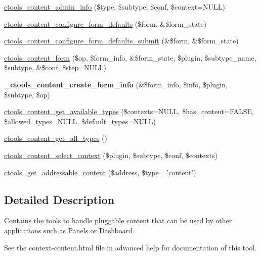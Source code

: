 \begin{DoxyCompactItemize}
\hyperlink{content_8inc_add05b7edd8612b6dfcea3eb5c7cea4cf}{ctools\_\-content\_\-admin\_\-info} (\$type, \$subtype, \$conf, \$context=NULL)
\item 
\hyperlink{content_8inc_aa433fb0534a5179c0f00b556dd22b5b3}{ctools\_\-content\_\-configure\_\-form\_\-defaults} (\$form, \&\$form\_\-state)
\item 
\hyperlink{content_8inc_af413cf9d35b010c5f527c1d2345c840c}{ctools\_\-content\_\-configure\_\-form\_\-defaults\_\-submit} (\&\$form, \&\$form\_\-state)
\item 
\hyperlink{content_8inc_a1eac5a29677be088ca112ac5158059a8}{ctools\_\-content\_\-form} (\$op, \$form\_\-info, \&\$form\_\-state, \$plugin, \$subtype\_\-name, \$subtype, \&\$conf, \$step=NULL)
\item 
\hypertarget{content_8inc_a6555b18d0f009f095fc84705804a3d9e}{
{\bfseries \_\-ctools\_\-content\_\-create\_\-form\_\-info} (\&\$form\_\-info, \$info, \$plugin, \$subtype, \$op)}
\label{content_8inc_a6555b18d0f009f095fc84705804a3d9e}

\item 
\hyperlink{content_8inc_a39110a11fabc723e97f07881a8f7a16f}{ctools\_\-content\_\-get\_\-available\_\-types} (\$contexts=NULL, \$has\_\-content=FALSE, \$allowed\_\-types=NULL, \$default\_\-types=NULL)
\item 
\hyperlink{content_8inc_aec142fe1e425f0d7087368dc17d4fd48}{ctools\_\-content\_\-get\_\-all\_\-types} ()
\item 
\hyperlink{content_8inc_a5d850254c7e33ba6b215841e1839eae5}{ctools\_\-content\_\-select\_\-context} (\$plugin, \$subtype, \$conf, \$contexts)
\item 
\hyperlink{content_8inc_a6fd8cc1103c59bb40d5ffcf8f3f1d06b}{ctools\_\-get\_\-addressable\_\-content} (\$address, \$type= 'content')
\end{DoxyCompactItemize}


\subsection{Detailed Description}
Contains the tools to handle pluggable content that can be used by other applications such as Panels or Dashboard.

See the context-\/content.html file in advanced help for documentation of this tool. 

